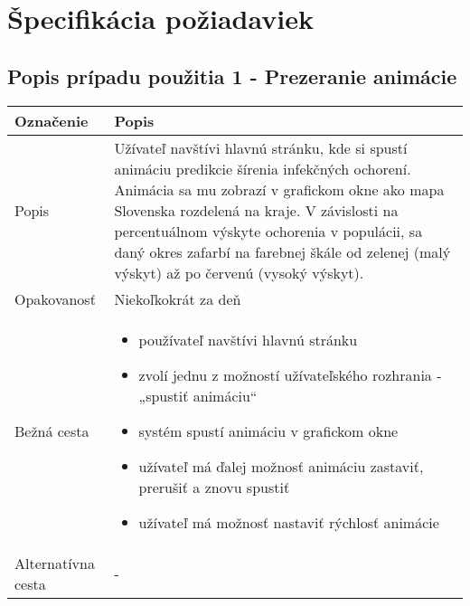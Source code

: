 \documentclass[12pt,a4paper]{report}
\begin{document}
\renewcommand{\chaptername}{}	
\chapter[Špecifikácia požiadaviek]{\rmfamily\bfseries
	Špecifikácia požiadaviek}
\section[Popis prípadu použitia 1 - Prezeranie animácie]{\rmfamily\bfseries
	Popis prípadu použitia 1 - Prezeranie animácie}
\begin{table}[h!]
	\centering
	\begin{tabular}{|>{\centering\arraybackslash}m{3in}|>{\centering\arraybackslash}m{3in}|}
		\hline
		\centering Označenie & Popis \\ [0ex]
		\hline
		Popis & Užívateľ navštívi hlavnú stránku, kde si spustí animáciu predikcie šírenia infekčných ochorení. Animácia sa mu
		zobrazí v grafickom okne ako mapa Slovenska rozdelená na kraje. V závislosti na percentuálnom výskyte ochorenia
		v populácii, sa daný okres zafarbí na farebnej škále od zelenej (malý výskyt) až po červenú (vysoký výskyt).\\ [0ex]
		\hline
		Opakovanosť & Niekoľkokrát za deň \\ [0ex]
		\hline
		Bežná cesta & 	\begin{itemize}
							\item používateľ navštívi hlavnú stránku 
							\item zvolí jednu z možností užívateľského rozhrania - „spustiť animáciu“
							\item systém spustí animáciu v grafickom okne
							\item užívateľ má ďalej možnosť animáciu zastaviť, prerušiť a znovu spustiť
							\item užívateľ má možnosť nastaviť rýchlosť animácie
						\end{itemize} \\ [0ex]
		\hline
		Alternatívna cesta & - \\ [0ex]
		\hline
	\end{tabular}
\end{table}
\pagebreak
\end{document}
